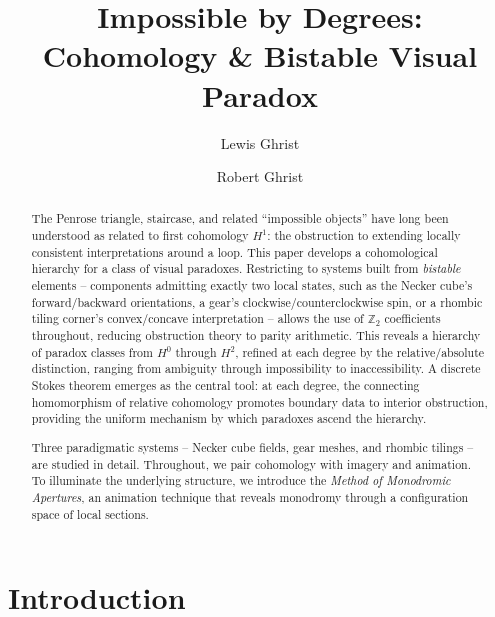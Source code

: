 \documentclass[11pt]{amsart}  %
\title[Impossible by Degrees]{Impossible by Degrees: \\ Cohomology \& Bistable Visual Paradox}
\author{Lewis Ghrist}
\author{Robert Ghrist}
\theoremstyle{plain}
\theoremstyle{definition}
\theoremstyle{remark}
\newcommand{\Z}{\mathbb{Z}} %
\begin{document}
\begin{abstract}
The Penrose triangle, staircase, and related ``impossible objects'' have long been understood as related to first cohomology $H^1$: the obstruction to extending locally consistent interpretations around a loop. This paper develops a cohomological hierarchy for a class of visual paradoxes. 
%
Restricting to systems built from \emph{bistable} elements -- components admitting exactly two local states, such as the Necker cube's forward/backward orientations, a gear's clockwise/counterclockwise spin, or a rhombic tiling corner's convex/concave interpretation -- allows the use of $\Z_2$ coefficients throughout, reducing obstruction theory to parity arithmetic. This reveals a hierarchy of paradox classes from $H^0$ through $H^2$, refined at each degree by the relative/absolute distinction, ranging from ambiguity through impossibility to inaccessibility.
A discrete Stokes theorem emerges as the central tool: at each degree, the connecting homomorphism of relative cohomology promotes boundary data to interior obstruction, providing the uniform mechanism by which paradoxes ascend the hierarchy.

Three paradigmatic systems -- Necker cube fields, gear meshes, and rhombic tilings -- are studied in detail. Throughout, we pair cohomology with imagery and animation. To illuminate the underlying structure, we introduce the \emph{Method of Monodromic Apertures}, an animation technique that reveals monodromy through a configuration space of local sections.
\end{abstract}


\maketitle

\section{Introduction}
\label{sec:intro}
\end{document}
